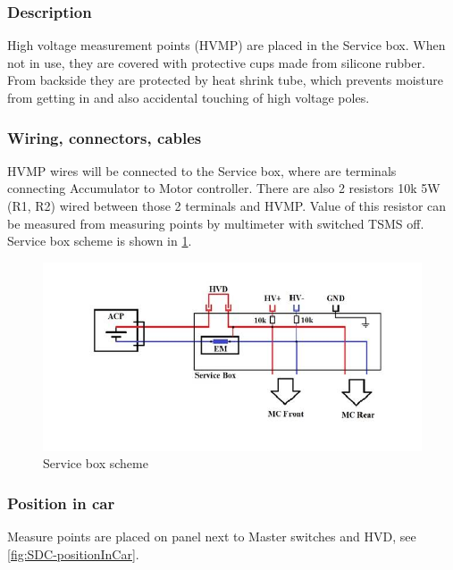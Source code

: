 \subsubsection{Description}

High voltage measurement points (HVMP) are placed in the Service box. When not in use, they are covered with protective cups made from silicone rubber. From backside they are protected by heat shrink tube, which prevents moisture from getting in and also accidental touching of high voltage poles.


\subsubsection{Wiring, connectors, cables}

HVMP wires will be connected to the Service box, where are terminals connecting Accumulator to Motor controller. There are also 2 resistors 10k 5W (R1, R2) wired between those 2 terminals and HVMP. Value of this resistor can be measured from measuring points by multimeter with switched TSMS off. Service box scheme is shown in \ref{fig:ServiceBox/scheme}.

\begin{figure}[H]
	\includegraphics[width=\textwidth]{./img/ServiceBox-scheme.jpg}
	\caption{Service box scheme}
	\label{fig:ServiceBox/scheme}
\end{figure}

\subsubsection{Position in car}

Measure points are placed on panel next to Master switches and HVD, see \ref{fig:SDC-positionInCar}.